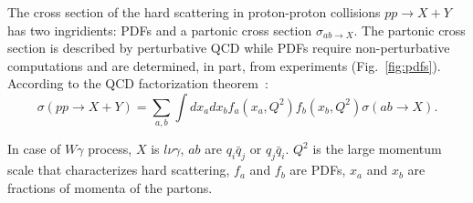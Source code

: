 The cross section of the hard scattering in proton-proton collisions $pp \rightarrow X+Y$ has two ingridients: PDFs and a partonic cross section $\sigma_{ab\rightarrow X}$. The partonic cross section is described by perturbative QCD while PDFs require non-perturbative computations and are determined, in part, from experiments (Fig.~\ref{fig:pdfs}). According to the QCD factorization theorem~\cite{ref_HardScattering}:\\

\begin{equation}\label{eq:ppCS_general}
  \sigma(pp \rightarrow X+Y)= \sum_{a,b} \int dx_a dx_b f_a(x_a,Q^2) f_b(x_b, Q^2) \sigma(ab \rightarrow X).
\end{equation}

In case of $W\gamma$ process, $X$ is $l \nu \gamma$, $ab$ are $q_i \bar{q}_j$ or $q_j \bar{q}_i$. $Q^2$ is the large momentum scale that characterizes hard scattering, $f_a$ and $f_b$ are PDFs, $x_a$ and $x_b$ are fractions of momenta of the partons.\\

